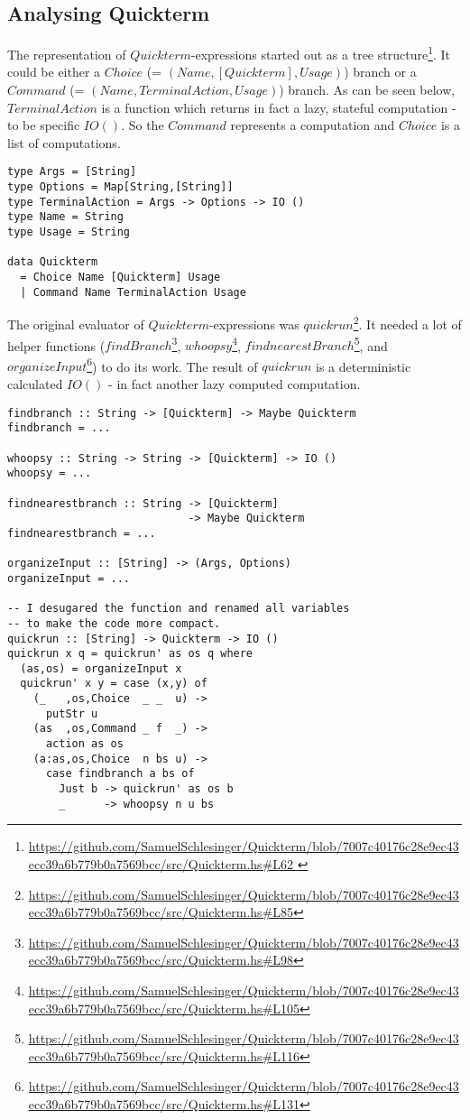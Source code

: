 \documentclass[a4paper]{article}
\begin{document}
\subsection{Analysing Quickterm}
The representation of $Quickterm$-expressions started out as a tree structure\footnote{\url{https://github.com/SamuelSchlesinger/Quickterm/blob/7007c40176c28e9ec43ecc39a6b779b0a7569bcc/src/Quickterm.hs\#L62 }}. It could be either a $Choice$ (= $(Name,[Quickterm],Usage)$) branch or a $Command$ (= $(Name,TerminalAction,Usage)$) branch. As can be seen below, $TerminalAction$ is a function which returns in fact a lazy, stateful computation - to be specific $IO ()$. So the $Command$ represents a computation and $Choice$ is a list of computations.

\begin{lstlisting}
type Args = [String]
type Options = Map[String,[String]]
type TerminalAction = Args -> Options -> IO ()
type Name = String
type Usage = String

data Quickterm
  = Choice Name [Quickterm] Usage
  | Command Name TerminalAction Usage
\end{lstlisting}

The original evaluator of $Quickterm$-expressions was $quickrun$\footnote{\url{https://github.com/SamuelSchlesinger/Quickterm/blob/7007c40176c28e9ec43ecc39a6b779b0a7569bcc/src/Quickterm.hs\#L85}}. It needed a lot of helper functions ($findBranch$\footnote{\url{https://github.com/SamuelSchlesinger/Quickterm/blob/7007c40176c28e9ec43ecc39a6b779b0a7569bcc/src/Quickterm.hs\#L98}}, $whoopsy$\footnote{\url{https://github.com/SamuelSchlesinger/Quickterm/blob/7007c40176c28e9ec43ecc39a6b779b0a7569bcc/src/Quickterm.hs\#L105}}, $findnearestBranch$\footnote{\url{https://github.com/SamuelSchlesinger/Quickterm/blob/7007c40176c28e9ec43ecc39a6b779b0a7569bcc/src/Quickterm.hs\#L116}}, and $organizeInput$\footnote{\url{https://github.com/SamuelSchlesinger/Quickterm/blob/7007c40176c28e9ec43ecc39a6b779b0a7569bcc/src/Quickterm.hs\#L131}}) to do its work. The result of $quickrun$ is a deterministic calculated $IO ()$ - in fact another lazy computed computation.

\begin{lstlisting}
findbranch :: String -> [Quickterm] -> Maybe Quickterm
findbranch = ...

whoopsy :: String -> String -> [Quickterm] -> IO ()
whoopsy = ...

findnearestbranch :: String -> [Quickterm]
                            -> Maybe Quickterm
findnearestbranch = ...

organizeInput :: [String] -> (Args, Options)
organizeInput = ...

-- I desugared the function and renamed all variables
-- to make the code more compact.
quickrun :: [String] -> Quickterm -> IO ()
quickrun x q = quickrun' as os q where
  (as,os) = organizeInput x
  quickrun' x y = case (x,y) of
    (_   ,os,Choice  _ _  u) ->
      putStr u
    (as  ,os,Command _ f  _) ->
      action as os
    (a:as,os,Choice  n bs u) ->
      case findbranch a bs of
        Just b -> quickrun' as os b
        _      -> whoopsy n u bs
\end{lstlisting}
\end{document}
